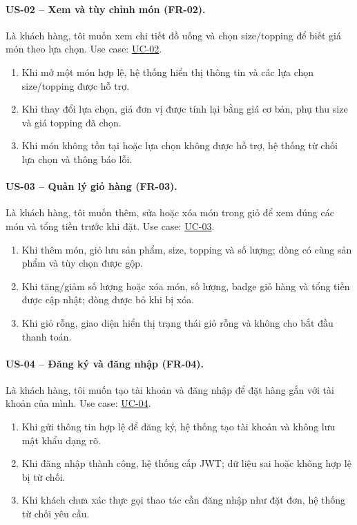 \paragraph{US-02 -- Xem và tùy chỉnh món (FR-02).}
Là khách hàng, tôi muốn xem chi tiết đồ uống và chọn size/topping để biết giá món theo lựa chọn. Use case: \hyperref[uc02]{UC-02}.
\begin{enumerate}[label=\textbf{AC\arabic*:},leftmargin=*]
  \item Khi mở một món hợp lệ, hệ thống hiển thị thông tin và các lựa chọn size/topping được hỗ trợ.
  \item Khi thay đổi lựa chọn, giá đơn vị được tính lại bằng giá cơ bản, phụ thu size và giá topping đã chọn.
  \item Khi món không tồn tại hoặc lựa chọn không được hỗ trợ, hệ thống từ chối lựa chọn và thông báo lỗi.
\end{enumerate}

\paragraph{US-03 -- Quản lý giỏ hàng (FR-03).}
Là khách hàng, tôi muốn thêm, sửa hoặc xóa món trong giỏ để xem đúng các món và tổng tiền trước khi đặt. Use case: \hyperref[uc03]{UC-03}.
\begin{enumerate}[label=\textbf{AC\arabic*:},leftmargin=*]
  \item Khi thêm món, giỏ lưu sản phẩm, size, topping và số lượng; dòng có cùng sản phẩm và tùy chọn được gộp.
  \item Khi tăng/giảm số lượng hoặc xóa món, số lượng, badge giỏ hàng và tổng tiền được cập nhật; dòng được bỏ khi bị xóa.
  \item Khi giỏ rỗng, giao diện hiển thị trạng thái giỏ rỗng và không cho bắt đầu thanh toán.
\end{enumerate}

\paragraph{US-04 -- Đăng ký và đăng nhập (FR-04).}
Là khách hàng, tôi muốn tạo tài khoản và đăng nhập để đặt hàng gắn với tài khoản của mình. Use case: \hyperref[uc04]{UC-04}.
\begin{enumerate}[label=\textbf{AC\arabic*:},leftmargin=*]
  \item Khi gửi thông tin hợp lệ để đăng ký, hệ thống tạo tài khoản và không lưu mật khẩu dạng rõ.
  \item Khi đăng nhập thành công, hệ thống cấp JWT; dữ liệu sai hoặc không hợp lệ bị từ chối.
  \item Khi khách chưa xác thực gọi thao tác cần đăng nhập như đặt đơn, hệ thống từ chối yêu cầu.
\end{enumerate}

